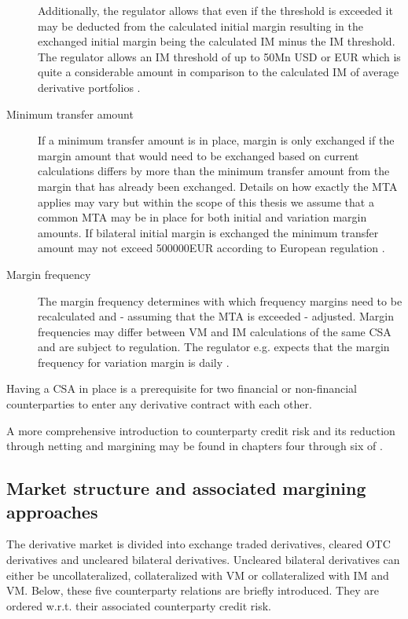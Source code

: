 \documentclass[../Thesis_AHoecherl.tex]{subfiles}
\begin{document}
\begin{description}
    Additionally, the regulator allows that even if the threshold is exceeded it may be deducted from the calculated initial margin resulting in the exchanged initial margin being the calculated \gls{IM} minus the \gls{IM} threshold.
    The regulator allows an IM threshold of up to 50Mn USD or EUR \cite[Requirement 2.2]{BCBS_MarginRequirements} which is quite a considerable amount in comparison to the calculated IM of average derivative portfolios \cite{ISDAMarginSurvey}.
    \item[Minimum transfer amount]
    If a minimum transfer amount is in place, margin is only exchanged if the margin amount that would need to be exchanged based on current calculations differs by more than the minimum transfer amount from the margin that has already been exchanged.
    Details on how exactly the \gls{MTA} applies may vary but within the scope of this thesis we assume that a common \gls{MTA} may be in place for both initial and variation margin amounts. If bilateral initial margin is exchanged the minimum transfer amount may not exceed 500000EUR according to European regulation \cite[Requirement 2.3]{BCBS_MarginRequirements}.  
    \item[Margin frequency]
    The margin frequency determines with which frequency margins need to be recalculated and - assuming that the MTA is exceeded - adjusted. Margin frequencies may differ between VM and IM calculations of the same \gls{CSA} and are subject to regulation. The regulator e.g. expects that the margin frequency for variation margin is daily \cite[Requirement 3.14]{BCBS_MarginRequirements}.
\end{description}

Having a CSA in place is a prerequisite for two financial or non-financial counterparties to enter any derivative contract with each other.

A more comprehensive introduction to counterparty credit risk and its reduction through netting and margining may be found in chapters four through six of \cite{gregory2015xva}.

\subsection{Market structure and associated margining approaches}\label{sec:Market strucutre and associated margining approaches}

The derivative market is divided into exchange traded derivatives, cleared OTC derivatives and uncleared bilateral derivatives. Uncleared bilateral derivatives can either be uncollateralized, collateralized with \gls{VM} or collateralized with \gls{IM} and \gls{VM}. Below, these five counterparty relations are briefly introduced. They are ordered w.r.t. their associated counterparty credit risk.
\end{document}
